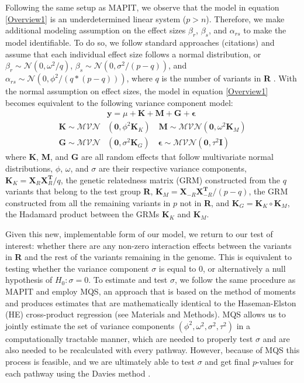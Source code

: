 \documentclass[12pt,a4paper]{article}
\begin{document}
Following the same setup as MAPIT, we observe that the model in equation \ref{Overview1} is an underdetermined linear system ($p > n$). Therefore, we make additional modeling assumption on the effect sizes $\beta_r$, $\beta_s$, and $\alpha_{rs}$ to make the model identifiable. To do so, we follow standard approaches (citations) and assume that each individual effect size follows a normal distribution, or $\beta_r \sim \mathcal{N}(0, \omega^2/q)$, $\beta_s \sim \mathcal{N}(0, \sigma^2/(p-q))$, and $\alpha_{rs} \sim \mathcal{N}(0, \phi^2/(q*(p-q)))$, where $q$ is the number of variants in \textbf{R} \citep{Crawford2017a}. With the normal assumption on effect sizes, the model in equation \ref{Overview1} becomes equivalent to the following variance component model:
\begin{align}\label{Overview2}
    & \textbf{y} = \mu + \textbf{K} + \textbf{M} + \textbf{G} + \boldsymbol{\epsilon} \\
    \textbf{K} \sim \mathcal{MVN}&(\textbf{0}, \phi^{2}\textbf{K}_K) \quad \textbf{M} \sim \mathcal{MVN}(\textbf{0}, \omega^{2}\textbf{K}_M) \nonumber \\ 
    \textbf{G} \sim \mathcal{MVN}&(\textbf{0}, \sigma^{2}\textbf{K}_G) \quad \boldsymbol{\epsilon} \sim \mathcal{MVN}(\textbf{0}, \tau^{2}\textbf{I}) \nonumber 
\end{align}
where \textbf{K}, \textbf{M}, and \textbf{G} are all random effects that follow multivariate normal distributions, $\phi$, $\omega$, and $\sigma$ are their respective variance components, $\textbf{K}_K = \textbf{X}_{R}\textbf{X}^{\textbf{T}}_{R}/q$, the genetic relatedness matrix (GRM) constructed from the $q$ variants that belong to the test group \textbf{R}, $\textbf{K}_M = \textbf{X}_{-R}\textbf{X}^{\textbf{T}}_{-R}/(p-q)$, the GRM constructed from all the remaining variants in $p$ not in \textbf{R}, and $\textbf{K}_G = \textbf{K}_K \circ \textbf{K}_M$, the Hadamard product between the GRMs $\textbf{K}_K$ and $\textbf{K}_M$.

Given this new, implementable form of our model, we return to our test of interest: whether there are any non-zero interaction effects between the variants in \textbf{R} and the rest of the variants remaining in the genome. This is equivalent to testing whether the variance component $\sigma$ is equal to 0, or alternatively a null hypothesis of $H_0: \sigma = 0$. To estimate and test $\sigma$, we follow the same procedure as MAPIT and employ MQS, an approach that is based on the method of moments and produces estimates that are mathematically identical to the Haseman-Elston (HE) cross-product regression \citep{Haseman1972, Zhou2017} (see Materials and Methods). MQS allows us to jointly estimate the set of variance components $(\phi^{2}, \omega^{2}, \sigma^{2}, \tau^{2})$ in a computationally tractable manner, which are needed to properly test $\sigma$ and are also needed to be recalculated with every pathway. However, because of MQS this process is feasible, and we are ultimately able to test $\sigma$ and get final $p$-values for each pathway using the Davies method \citep{Crawford2017a,Davies1980}.  
\end{document}
